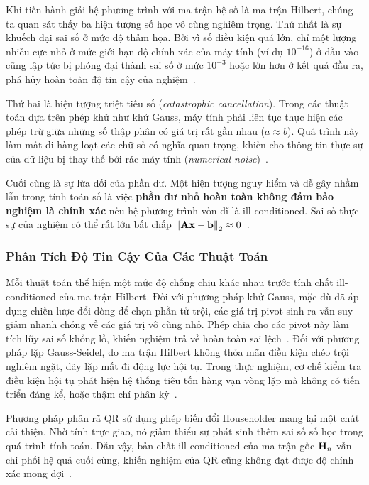 Khi tiến hành giải hệ phương trình với ma trận hệ số là ma trận Hilbert, chúng ta quan sát thấy ba hiện tượng số học vô cùng nghiêm trọng. Thứ nhất là sự khuếch đại sai số ở mức độ thảm họa. Bởi vì số điều kiện quá lớn, chỉ một lượng nhiễu cực nhỏ ở mức giới hạn độ chính xác của máy tính (ví dụ $10^{-16}$) ở đầu vào cũng lập tức bị phóng đại thành sai số ở mức $10^{-3}$ hoặc lớn hơn ở kết quả đầu ra, phá hủy hoàn toàn độ tin cậy của nghiệm~\cite{higham2002}.

Thứ hai là hiện tượng triệt tiêu số (\textit{catastrophic cancellation}). Trong các thuật toán dựa trên phép khử như khử Gauss, máy tính phải liên tục thực hiện các phép trừ giữa những số thập phân có giá trị rất gần nhau ($a \approx b$). Quá trình này làm mất đi hàng loạt các chữ số có nghĩa quan trọng, khiến cho thông tin thực sự của dữ liệu bị thay thế bởi rác máy tính (\textit{numerical noise})~\cite{higham2002, wilkinson1965}.

Cuối cùng là sự lừa dối của phần dư. Một hiện tượng nguy hiểm và dễ gây nhầm lẫn trong tính toán số là việc \textbf{phần dư nhỏ hoàn toàn không đảm bảo nghiệm là chính xác} nếu hệ phương trình vốn dĩ là ill-conditioned. Sai số thực sự của nghiệm có thể rất lớn bất chấp $\left\lVert\mathbf{A}\mathbf{x} - \mathbf{b}\right\rVert_2 \approx 0$~\cite{higham2002}.

\subsubsection{Phân Tích Độ Tin Cậy Của Các Thuật Toán}

Mỗi thuật toán thể hiện một mức độ chống chịu khác nhau trước tính chất ill-conditioned của ma trận Hilbert. Đối với phương pháp khử Gauss, mặc dù đã áp dụng chiến lược đổi dòng để chọn phần tử trội, các giá trị pivot sinh ra vẫn suy giảm nhanh chóng về các giá trị vô cùng nhỏ. Phép chia cho các pivot này làm tích lũy sai số khổng lồ, khiến nghiệm trả về hoàn toàn sai lệch~\cite{golub2013}. Đối với phương pháp lặp Gauss-Seidel, do ma trận Hilbert không thỏa mãn điều kiện chéo trội nghiêm ngặt, dãy lặp mất đi động lực hội tụ. Trong thực nghiệm, cơ chế kiểm tra điều kiện hội tụ phát hiện hệ thống tiêu tốn hàng vạn vòng lặp mà không có tiến triển đáng kể, hoặc thậm chí phân kỳ~\cite{strang2023}.

Phương pháp phân rã QR sử dụng phép biến đổi Householder mang lại một chút cải thiện. Nhờ tính trực giao, nó giảm thiểu sự phát sinh thêm sai số số học trong quá trình tính toán. Dẫu vậy, bản chất ill-conditioned của ma trận gốc $\mathbf{H}_n$ vẫn chi phối hệ quả cuối cùng, khiến nghiệm của QR cũng không đạt được độ chính xác mong đợi~\cite{trefethen1997}.

